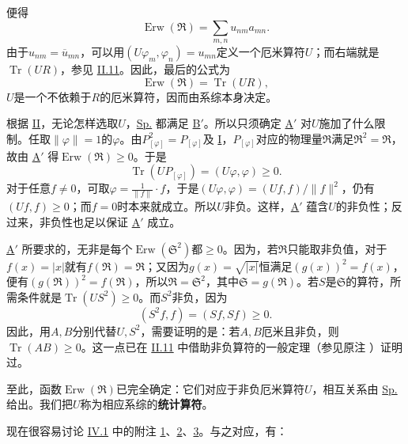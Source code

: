 \documentclass[fontsize=13pt,twoside,openany,headings=normal,parskip=false,bookmarkpackage=false,DIV=calc]{scrbook}
\begin{document}
便得
\[
\operatorname{Erw}(\mathfrak R)=\sum_{m,n}u_{nm}a_{mn}.
\]
由于$u_{nm}=\overline{u}_{mn}$，可以用$(U\varphi_m,\allowbreak \varphi_n)=u_{mn}$定义一个厄米算符$U$；而右端就是$\operatorname{Tr}(UR)$，参见 \hyperref[sec:II.11]{II.11}。因此，最后的公式为
\begin{equation}\tag{Sp.}\label{eq:IV.2.Sp}
\operatorname{Erw}(\mathfrak R)=\operatorname{Tr}(UR),
\end{equation}
$U$是一个不依赖于$R$的厄米算符，因而由系综本身决定。

根据 \hyperref[cond:IV.2.II]{II}，无论怎样选取$U$，\hyperref[eq:IV.2.Sp]{Sp.} 都满足 \hyperref[cond:IV.Bprime]{B$'$}。所以只须确定 \hyperref[cond:IV.Aprime]{A$'$} 对$U$施加了什么限制。任取$\|\varphi\|=1$的$\varphi$。由$P_{[\varphi]}^2=P_{[\varphi]}$及 \hyperref[cond:IV.2.I]{I}，$P_{[\varphi]}$对应的物理量$\mathfrak R$满足$\mathfrak R^2=\mathfrak R$，故由 \hyperref[cond:IV.Aprime]{A$'$} 得$\operatorname{Erw}(\mathfrak R)\geq0$。于是
\[
\operatorname{Tr}(UP_{[\varphi]})=(U\varphi,\varphi)\geq0.
\]
对于任意$f\ne0$，可取$\varphi=\frac1{\|f\|}\cdot f$，于是$(U\varphi,\allowbreak \varphi)=(Uf,\allowbreak f)/\|f\|^2$，仍有$(Uf,\allowbreak f)\geq0$；而$f=0$时本来就成立。所以$U$非负。这样，\hyperref[cond:IV.Aprime]{A$'$} 蕴含$U$的非负性；反过来，非负性也足以保证 \hyperref[cond:IV.Aprime]{A$'$} 成立。

\hyperref[cond:IV.Aprime]{A$'$} 所要求的，无非是每个$\operatorname{Erw}(\mathfrak S^2)$都$\geq0$。因为，若$\mathfrak R$只能取非负值，对于$f(x)=|x|$就有$f(\mathfrak R)=\mathfrak R$；又因为$g(x)=\sqrt{|x|}$恒满足$(g(x))^2=f(x)$，便有$(g(\mathfrak R))^2=f(\mathfrak R)$，所以$\mathfrak R=\mathfrak S^2$，其中$\mathfrak S=g(\mathfrak R)$。若$S$是$\mathfrak S$的算符，所需条件就是$\operatorname{Tr}(US^2)\geq0$。而$S^2$非负，因为
\[
(S^2f,f)=(Sf,Sf)\geq0.
\]
因此，用$A,\allowbreak B$分别代替$U,\allowbreak S^2$，需要证明的是：若$A,\allowbreak B$厄米且非负，则$\operatorname{Tr}(AB)\geq0$。这一点已在 \hyperref[sec:II.11]{II.11} 中借助非负算符的一般定理（参见原注 \hyperlink{note-114}{}）证明过。

至此，函数$\operatorname{Erw}(\mathfrak R)$已完全确定：它们对应于非负厄米算符$U$，相互关系由 \hyperref[eq:IV.2.Sp]{Sp.} 给出。我们把$U$称为相应系综的\textbf{统计算符}。

现在很容易讨论 \hyperref[sec:IV.1]{IV.1} 中的附注 \hyperref[remark:IV.1.1]{1}、\hyperref[remark:IV.1.2]{2}、\hyperref[remark:IV.1.3]{3}。与之对应，有：
\end{document}
